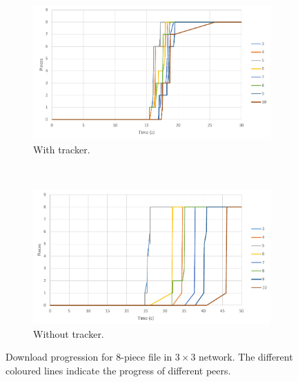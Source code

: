 \begin{figure}
	\centering
	\begin{subfigure}[b]{\textwidth}
		\centering
		\includegraphics[width=\linewidth]{graphs/scale/tracker-3x3-progress.pdf}
		\caption{With tracker.}
		\label{fig:eval:scale:3x3:tracker}
	\end{subfigure}%
	\\
	\begin{subfigure}[b]{\textwidth}
		\centering
		\includegraphics[width=\linewidth]{graphs/scale/no-tracker-3x3-progress.pdf}
		\caption{Without tracker.}
		\label{fig:eval:scale:3x3:no-tracker}
	\end{subfigure}
	\caption[Download progression in $3 \times 3$ network]{Download progression for 8-piece file in $3 \times 3$ network. The different coloured lines indicate the progress of different peers.}
	\label{fig:eval:scale:3x3}
\end{figure}

